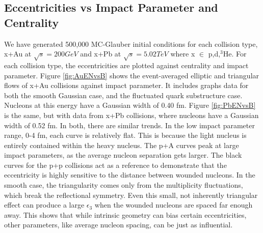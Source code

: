 \documentclass[twocolumn,showpacs,amsfonts,aps,prc,nofootinbib,floatfix]{revtex4}
\begin{document}
\subsection{Eccentricities vs Impact Parameter and Centrality}
\label{subsec:EccentricitiesVsB&Cent}
We have generated 500,000 MC-Glauber initial conditions for each collision type, x+Au at $\sqrt{s} = 200GeV$ and x+Pb at $\sqrt{s} = 5.02TeV$ where x $\in$ {p,d,$^3$He}. For each collision type, the eccentricities are plotted against centrality and impact parameter. Figure \ref{fig:AuENvsB} shows the event-averaged elliptic and triangular flows of x+Au collisions against impact parameter. It includes graphs data for both the smooth Gaussian case, and the fluctuated quark substructure case. Nucleons at this energy have a Gaussian width of 0.40 fm. Figure \ref{fig:PbENvsB} is the same, but with data from x+Pb collisions, where nucleons have a Gaussian width of 0.52 fm. In both, there are similar trends. In the low impact parameter range, 0-4 fm, each curve is relatively flat. This is because the light nucleus is entirely contained within the heavy nucleus. The p+A curves peak at large impact parameters, as the average nucleon separation gets larger. The black curves for the p+p collisions act as a reference to demonstrate that the eccentricity is highly sensitive to the distance between wounded nucleons. In the smooth case, the triangularity comes only from the multiplicity fluctuations, which break the reflectional symmetry. Even this small, not inherently triangular effect can produce a large $\epsilon_3$ when the wounded nucleons are spaced far enough away. This shows that while intrinsic geometry can bias certain eccentricities, other parameters, like average nucleon spacing, can be just as influential.
\end{document}
